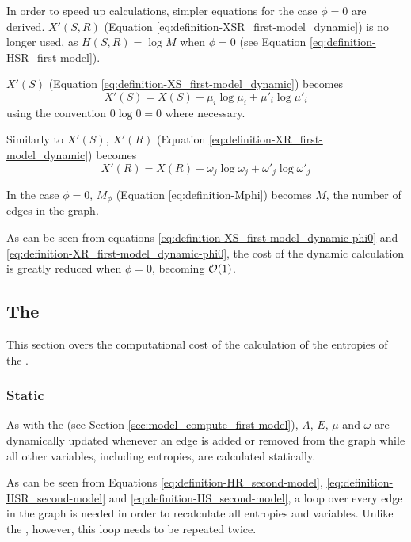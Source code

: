 In order to speed up calculations, simpler equations for the case $\phi=0$ are derived.
$X'(S,R)$ (Equation \eqref{eq:definition-XSR_first-model_dynamic}) is no longer used, as $H(S,R) = \log M$ when $\phi=0$ (see Equation \eqref{eq:definition-HSR_first-model}).

$X'(S)$ (Equation \eqref{eq:definition-XS_first-model_dynamic}) becomes
\begin{equation}
  \label{eq:definition-XS_first-model_dynamic-phi0}
  X'(S) = X(S) - \mu_i \log \mu_i + \mu'_i \log \mu'_i
\end{equation}
using the convention $0 \log 0 = 0$ where necessary.

Similarly to $X'(S)$, $X'(R)$ (Equation \eqref{eq:definition-XR_first-model_dynamic}) becomes
\begin{equation}
  \label{eq:definition-XR_first-model_dynamic-phi0}
  X'(R) = X(R) - \omega_j \log \omega_j + \omega'_j \log \omega'_j
\end{equation}

In the case $\phi=0$, $M_\phi$ (Equation \eqref{eq:definition-Mphi}) becomes $M$, the number of edges in the graph.

As can be seen from equations \eqref{eq:definition-XS_first-model_dynamic-phi0} and \eqref{eq:definition-XR_first-model_dynamic-phi0}, the cost of the dynamic calculation is greatly reduced when $\phi=0$, becoming $\mathcal{O}(1)$.

\subsection{The \secondmodel{}}
\label{sec:model_compute_second-model}

This section overs the computational cost of the calculation of the entropies of the \secondmodel{}.

\subsubsection{Static}

As with the \firstmodel{} (see Section \ref{sec:model_compute_first-model}), $A$, $E$, $\mu$ and $\omega$ are dynamically updated whenever an edge is added or removed from the graph while all other variables, including entropies, are calculated statically.

As can be seen from Equations \eqref{eq:definition-HR_second-model}, \eqref{eq:definition-HSR_second-model} and \eqref{eq:definition-HS_second-model}, a loop over every edge in the graph is needed in order to recalculate all entropies and variables.
Unlike the \firstmodel{}, however, this loop needs to be repeated twice.

